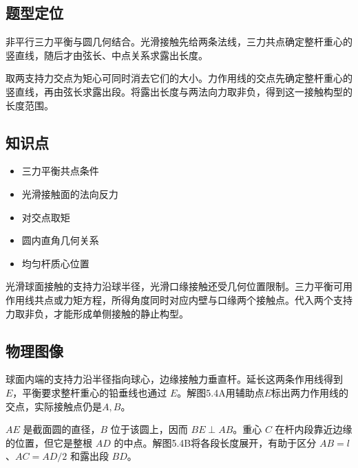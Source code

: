 \documentclass[UTF8,fontset=fandol,a4paper,11pt]{ctexart}
\providecommand{\tightlist}{\setlength{\itemsep}{0pt}\setlength{\parskip}{0pt}}
\begin{document}


\subsection*{题型定位}

非平行三力平衡与圆几何结合。光滑接触先给两条法线，三力共点确定整杆重心的竖直线，随后才由弦长、中点关系求露出长度。

取两支持力交点为矩心可同时消去它们的大小。力作用线的交点先确定整杆重心的竖直线，再由弦长求露出段。将露出长度与两法向力取非负，得到这一接触构型的长度范围。



\subsection*{知识点}

\begin{itemize}
\tightlist
\item
  三力平衡共点条件
\item
  光滑接触面的法向反力
\item
  对交点取矩
\item
  圆内直角几何关系
\item
  均匀杆质心位置
\end{itemize}

光滑球面接触的支持力沿球半径，光滑口缘接触还受几何位置限制。三力平衡可用作用线共点或力矩方程，所得角度同时对应内壁与口缘两个接触点。代入两个支持力取非负，才能形成单侧接触的静止构型。




\subsection*{物理图像}

球面内端的支持力沿半径指向球心，边缘接触力垂直杆。延长这两条作用线得到 $E$，平衡要求整杆重心的铅垂线也通过 $E$。解图5.4A用辅助点$E$标出两力作用线的交点，实际接触点仍是$A,B$。

$AE$ 是截面圆的直径，$B$ 位于该圆上，因而 $BE\perp AB$。重心 $C$ 在杆内段靠近边缘的位置，但它是整根 $AD$ 的中点。解图5.4B将各段长度展开，有助于区分 $AB=l$、$AC=AD/2$ 和露出段 $BD$。

\end{document}
